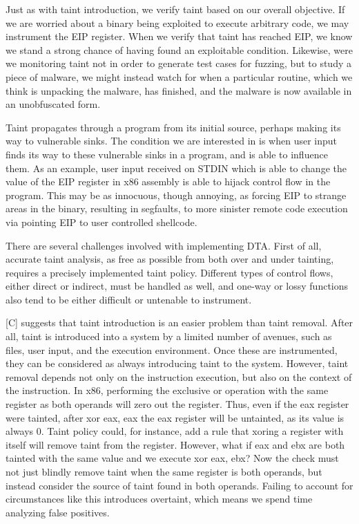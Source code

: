 \documentclass[11pt,expanded,copyright]{fsuthesis}
\begin{document}
Just as with taint introduction, we verify taint based on our overall objective. If we are worried about a binary being exploited to execute arbitrary code, we may instrument the EIP register. When we verify that taint has reached EIP, we know we stand a strong chance of having found an exploitable condition. Likewise, were we monitoring taint not in order to generate test cases for fuzzing, but to study a piece of malware, we might instead watch for when a particular routine, which we think is unpacking the malware, has finished, and the malware is now available in an unobfuscated form.

Taint propagates through a program from its initial source, perhaps making its way to vulnerable sinks. The condition we are interested in is when user input finds its way to these vulnerable sinks in a program, and is able to influence them. As an example, user input received on STDIN which is able to change the value of the EIP register in x86 assembly is able to hijack control flow in the program. This may be as innocuous, though annoying, as forcing EIP to strange areas in the binary, resulting in segfaults, to more sinister remote code execution via pointing EIP to user controlled shellcode.

There are several challenges involved with implementing DTA. First of all, accurate taint analysis, as free as possible from both over and under tainting, requires a precisely implemented taint policy. Different types of control flows, either direct or indirect, must be handled as well, and one-way or lossy functions also tend to be either difficult or untenable to instrument.

[C] suggests that taint introduction is an easier problem than taint removal. After all, taint is introduced into a system by a limited number of avenues, such as files, user input, and the execution environment. Once these are instrumented, they can be considered as always introducing taint to the system. However, taint removal depends not only on the instruction execution, but also on the context of the instruction. In x86, performing the exclusive or operation with the same register as both operands will zero out the register. Thus, even if the eax register were tainted, after xor eax, eax the eax register will be untainted, as its value is always 0. Taint policy could, for instance, add a rule that xoring a register with itself will remove taint from the register. However, what if eax and ebx are both tainted with the same value and we execute xor eax, ebx? Now the check must not just blindly remove taint when the same register is both operands, but instead consider the source of taint found in both operands. Failing to account for circumstances like this introduces overtaint, which means we spend time analyzing false positives. 
\end{document}
